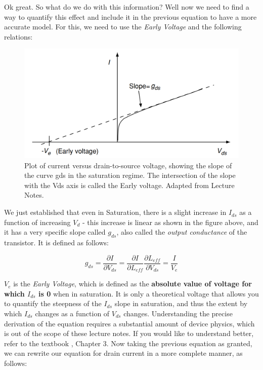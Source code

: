 Ok great. So what do we do with this information? Well now we need to find a way to quantify this effect and include it in the previous equation to have a more accurate model. For this, we need to use the \emph{Early Voltage} and the following relations: 

\begin{figure}[H]
    \centering
    \includegraphics[width=0.95\linewidth]{../../Figures/Early_Voltage.PNG}
    \caption{Plot of current versus drain-to-source voltage, showing the slope of the curve gds in the saturation regime. The intersection of the slope with the Vds axis is called the Early voltage. Adapted from Lecture Notes.}
    \label{fig:basalandcerebellum}
\end{figure}

We just established that even in Saturation, there is a slight increase in $I_{ds}$ as a function of increasing $V_{d}$ - this increase is linear as shown in the figure above, and it has a very specific slope called $g_{ds}$, also called the \emph{output conductance} of the transistor. It is defined as follows: 

\begin{equation}
g_{ds} = \frac{\partial I}{\partial V_{ds}} = \frac{\partial I}{\partial L_{eff}}\frac{\partial L_{eff}}{\partial V_{ds}} = \frac{I}{V_e}
\end{equation}

$V_{e}$ is the \emph{Early Voltage}, which is defined as the \textbf{absolute value of voltage for which $I_{ds}$ is 0} when in saturation. It is only a theoretical voltage that allows you to quantify the steepness of the $I_{ds}$ slope in saturation, and thus the extent by which $I_{ds}$ changes as a function of $V_{ds}$ changes. 
Understanding the precise derivation of the equation requires a substantial amount of device physics, which is out of the scope of these lecture notes. If you would like to understand better, refer to the textbook \cite{liu2002analog}, Chapter 3. Now taking the previous equation as granted, we can rewrite our equation for drain current in a more complete manner, as follows:

